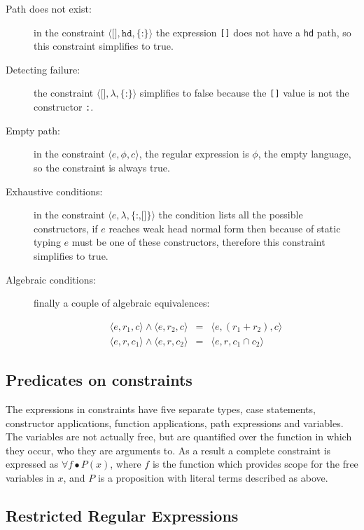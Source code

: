 \documentclass[preprint]{sigplanconf}
\newcommand{\T}[1]{\texttt{#1}}
\newcommand{\tup}[1]{\ensuremath{\langle #1 \rangle}}
\renewcommand{\c}[3]{\tup{\T{#1},\T{#2},\T{\{#3\}}}}
\newcommand{\cc}[2]{\c{#1}{$\lambda$}{#2}}
\begin{document}
\begin{description}

\item[Path does not exist:] in the constraint \c{[]}{hd}{:} the expression
\T{[]} does not have a \T{hd} path, so this constraint simplifies to
true.

\item[Detecting failure:] the constraint \cc{[]}{:} simplifies to false
because the \T{[]} value is not the constructor \T{:}.

\item[Empty path:] in the constraint $\tup{e,\phi,c}$, the
regular expression is $\phi$, the empty language, so the constraint
is always true.

\item[Exhaustive conditions:] in the constraint \cc{$e$}{:,[]}
the condition lists all the possible constructors, if $e$ reaches
weak head normal form then because of static typing $e$ must be one
of these constructors, therefore this constraint simplifies to true.

\item[Algebraic conditions:] finally a couple of algebraic equivalences:

\[
\begin{array}{rcl}
\tup{e,r_1,c} \wedge \tup{e,r_2,c} & = & \tup{e,(r_1+r_2),c} \\
\tup{e,r,c_1} \wedge \tup{e,r,c_2} & = & \tup{e,r,c_1 \cap c_2}
\end{array}
\]
\end{description}

\subsection{Predicates on constraints}

The expressions in constraints have five separate types, case statements,
constructor applications, function applications, path expressions and
variables. The variables are not actually free, but are quantified over the
function in which they occur, who they are arguments to. As a result a complete
constraint is expressed as $\forall f \bullet P(x)$, where $f$ is the function
which provides scope for the free variables in $x$, and $P$ is a proposition
with literal terms described as above.

\subsection{Restricted Regular Expressions}
\end{document}
